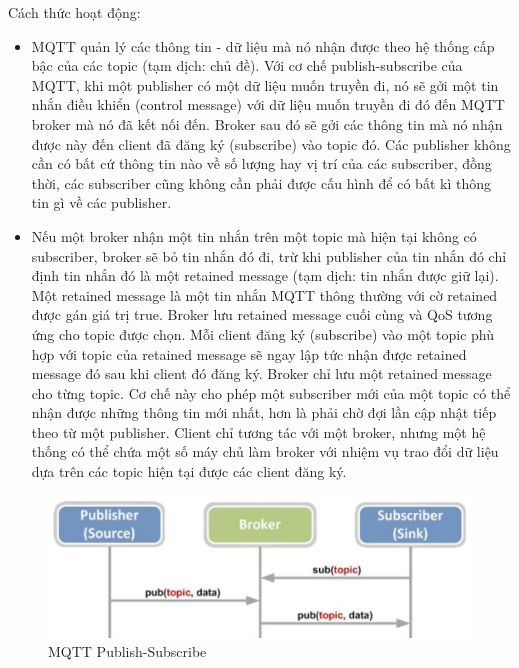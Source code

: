 \documentclass{report}
\begin{document}
Cách thức hoạt động: 
\begin{itemize}
\item MQTT quản lý các thông tin - dữ liệu mà nó nhận được theo hệ thống cấp bậc của các topic (tạm dịch: chủ đề). Với cơ chế publish-subscribe của MQTT, khi một publisher có một dữ liệu muốn truyền đi, nó sẽ gởi một tin nhắn điều khiển (control message) với dữ liệu muốn truyền đi đó đến MQTT broker mà nó đã kết nối đến. Broker sau đó sẽ gởi các thông tin mà nó nhận được này đến client đã đăng ký (subscribe) vào topic đó. Các publisher không cần có bất cứ thông tin nào về số lượng hay vị trí của các subscriber, đồng thời, các subscriber cũng không cần phải được cấu hình để có bất kì thông tin gì về các publisher.
\item Nếu một broker nhận một tin nhắn trên một topic mà hiện tại không có subscriber, broker sẽ bỏ tin nhắn đó đi, trừ khi publisher của tin nhắn đó chỉ định tin nhắn đó là một retained message (tạm dịch: tin nhắn được giữ lại). Một retained message là một tin nhắn MQTT thông thường với cờ retained được gán giá trị true. Broker lưu retained message cuối cùng và QoS tương ứng cho topic được chọn. Mỗi client đăng ký (subscribe) vào một topic phù hợp với topic của retained message sẽ ngay lập tức nhận được retained message đó sau khi client đó đăng ký. Broker chỉ lưu một retained message cho từng topic. Cơ chế này cho phép một subscriber mới của một topic có thể nhận được những thông tin mới nhất, hơn là phải chờ đợi lần cập nhật tiếp theo từ một publisher. Client chỉ tương tác với một broker, nhưng một hệ thống có thể chứa một số máy chủ làm broker với nhiệm vụ trao đổi dữ liệu dựa trên các topic hiện tại được các client đăng ký.
\end{itemize}
\begin{figure}[h]
	\centering
	\includegraphics[scale = 0.7]{fig15.png}
	\caption{MQTT Publish-Subscribe}
	\label{fig:Graph15}
\end{figure}
\end{document}

